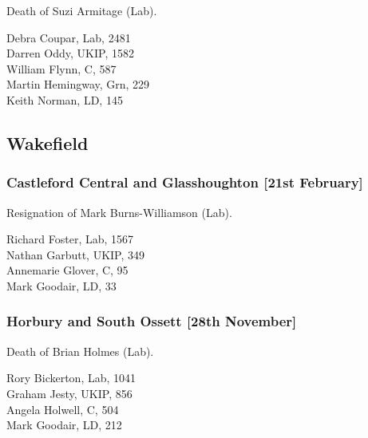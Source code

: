 \documentclass[a4paper,openany,10pt]{book}
\begin{document}

Death of Suzi Armitage (Lab).



Debra Coupar, Lab, 2481\\
Darren Oddy, UKIP, 1582\\
William Flynn, C, 587\\
Martin Hemingway, Grn, 229\\
Keith Norman, LD, 145\\


\subsection*{Wakefield}

\subsubsection*{Castleford Central and Glasshoughton \hspace*{\fill}\nolinebreak[1]%
\enspace\hspace*{\fill}
[21st February]}


Resignation of Mark Burns-Williamson (Lab).



Richard Foster, Lab, 1567\\
Nathan Garbutt, UKIP, 349\\
Annemarie Glover, C, 95\\
Mark Goodair, LD, 33\\


\subsubsection*{Horbury and South Ossett \hspace*{\fill}\nolinebreak[1]%
\enspace\hspace*{\fill}
[28th November]}


Death of Brian Holmes (Lab).



Rory Bickerton, Lab, 1041\\
Graham Jesty, UKIP, 856\\
Angela Holwell, C, 504\\
Mark Goodair, LD, 212\\
\end{document}
